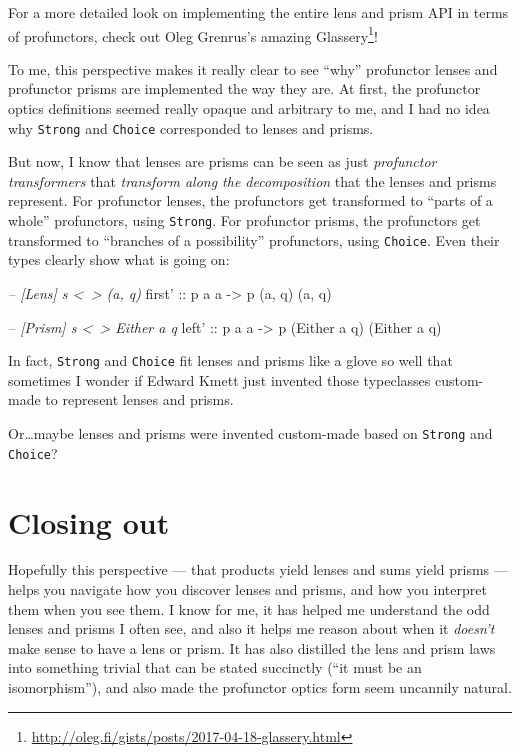 \documentclass[]{article}
\newenvironment{Shaded}{}{}
\newcommand{\CommentTok}[1]{\textcolor[rgb]{0.38,0.63,0.69}{\textit{#1}}}
\newcommand{\DataTypeTok}[1]{\textcolor[rgb]{0.56,0.13,0.00}{#1}}
\newcommand{\NormalTok}[1]{#1}
\newcommand{\OtherTok}[1]{\textcolor[rgb]{0.00,0.44,0.13}{#1}}
\renewcommand{\href}[2]{#2\footnote{\url{#1}}}
\begin{document}
For a more detailed look on implementing the entire lens and prism API in terms
of profunctors, check out Oleg Grenrus's amazing
\href{http://oleg.fi/gists/posts/2017-04-18-glassery.html}{Glassery}!

To me, this perspective makes it really clear to see ``why'' profunctor lenses
and profunctor prisms are implemented the way they are. At first, the profunctor
optics definitions seemed really opaque and arbitrary to me, and I had no idea
why \texttt{Strong} and \texttt{Choice} corresponded to lenses and prisms.

But now, I know that lenses are prisms can be seen as just \emph{profunctor
transformers} that \emph{transform along the decomposition} that the lenses and
prisms represent. For profunctor lenses, the profunctors get transformed to
``parts of a whole'' profunctors, using \texttt{Strong}. For profunctor prisms,
the profunctors get transformed to ``branches of a possibility'' profunctors,
using \texttt{Choice}. Even their types clearly show what is going on:

\begin{Shaded}
\begin{Highlighting}[]
\CommentTok{-- [Lens]  s <~> (a, q)}
\OtherTok{first' ::}\NormalTok{ p a a }\OtherTok{->}\NormalTok{ p (a, q) (a, q)}

\CommentTok{-- [Prism] s <~> Either a q}
\OtherTok{left'  ::}\NormalTok{ p a a }\OtherTok{->}\NormalTok{ p (}\DataTypeTok{Either}\NormalTok{ a q) (}\DataTypeTok{Either}\NormalTok{ a q)}
\end{Highlighting}
\end{Shaded}

In fact, \texttt{Strong} and \texttt{Choice} fit lenses and prisms like a glove
so well that sometimes I wonder if Edward Kmett just invented those typeclasses
custom-made to represent lenses and prisms.

Or\ldots{}maybe lenses and prisms were invented custom-made based on
\texttt{Strong} and \texttt{Choice}?

\hypertarget{closing-out}{%
\section{Closing out}\label{closing-out}}

Hopefully this perspective --- that products yield lenses and sums yield prisms
--- helps you navigate how you discover lenses and prisms, and how you interpret
them when you see them. I know for me, it has helped me understand the odd
lenses and prisms I often see, and also it helps me reason about when it
\emph{doesn't} make sense to have a lens or prism. It has also distilled the
lens and prism laws into something trivial that can be stated succinctly (``it
must be an isomorphism''), and also made the profunctor optics form seem
uncannily natural.
\end{document}
